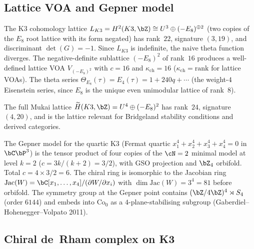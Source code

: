 \subsection{Lattice VOA and Gepner model}
\label{subsec:lattice-gepner}

\begin{remark}
\label{rem:lattice-voa-k3}
The K3 cohomology lattice $L_{K3} = H^2(K3,\bZ) \cong U^3 \oplus
(-E_8)^{\oplus 2}$ (two copies of the $E_8$ root lattice with its
form negated) has rank~$22$, signature $(3,19)$, and discriminant
$\det(G) = -1$. Since $L_{K3}$ is indefinite, the naive theta
function diverges. The negative-definite sublattice $(-E_8)^2$
of rank~$16$ produces a well-defined lattice VOA
$V_{(-E_8)^2}$ with $c = 16$ and $\kappa_{\mathrm{ch}} = 16$
($\kappa_{\mathrm{ch}} = \mathrm{rank}$ for lattice VOAs). The
theta series $\Theta_{E_8}(\tau) = E_4(\tau) = 1 + 240q + \cdots$
(the weight-$4$ Eisenstein series, since $E_8$ is the unique even
unimodular lattice of rank~$8$).

The full Mukai lattice $\widetilde{H}(K3,\bZ) = U^4 \oplus
(-E_8)^2$ has rank~$24$, signature $(4,20)$, and is the lattice
relevant for Bridgeland stability conditions and derived
categories.
\end{remark}

\begin{remark}
\label{rem:gepner-model-k3}
The Gepner model for the quartic K3 (Fermat quartic
$x_1^4 + x_2^4 + x_3^4 + x_4^4 = 0$ in $\bC\bP^3$) is the
tensor product of four copies of the $\cN = 2$ minimal model at
level $k = 2$ ($c = 3k/(k+2) = 3/2$), with GSO
projection and $\bZ_4$ orbifold. Total $c = 4 \times 3/2 = 6$.
The chiral ring is isomorphic to the Jacobian ring
$\mathrm{Jac}(W) = \bC[x_1,\ldots,x_4]/(\partial W/\partial x_i)$
with $\dim \mathrm{Jac}(W) = 3^4 = 81$ before orbifold. The
symmetry group at the Gepner point contains
$(\bZ/4\bZ)^4 \rtimes S_4$ (order $6144$) and embeds into
$\mathrm{Co}_0$ as a $4$-plane-stabilising subgroup
(Gaberdiel--Hohenegger--Volpato 2011).
\end{remark}

\subsection{Chiral de~Rham complex on K3}
\label{subsec:cdr-k3}

